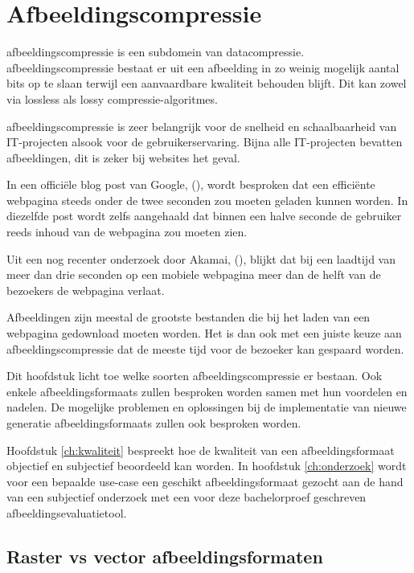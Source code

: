 \chapter{Afbeeldingscompressie}
\label{ch:afbeeldingscompressie}

\Gls{afbeeldingscompressie} is een subdomein van \gls{datacompressie}. \Gls{afbeeldingscompressie} bestaat er uit een afbeelding in zo weinig mogelijk aantal \glspl{bit} op te slaan terwijl een aanvaardbare kwaliteit behouden blijft. Dit kan zowel via \gls{lossless} als \gls{lossy} \glspl{compressie-algoritme}.

\Gls{afbeeldingscompressie} is zeer belangrijk voor de snelheid en schaalbaarheid van IT-projecten alsook voor de gebruikerservaring. Bijna alle IT-projecten bevatten afbeeldingen, dit is zeker bij websites het geval.

In een officiële blog post van Google,  (\cite{googleinternetspeed}), wordt besproken dat een efficiënte webpagina steeds onder de twee seconden zou moeten geladen kunnen worden. In diezelfde post wordt zelfs aangehaald dat binnen een halve seconde de gebruiker reeds inhoud van de webpagina zou moeten zien.

Uit een nog recenter onderzoek door Akamai,  (\cite{akamaiinternetspeed}), blijkt dat bij een laadtijd van meer dan drie seconden op een mobiele webpagina meer dan de helft van de bezoekers de webpagina verlaat.

Afbeeldingen zijn meestal de grootste bestanden die bij het laden van een webpagina gedownload moeten worden. Het is dan ook met een juiste keuze aan \gls{afbeeldingscompressie} dat de meeste tijd voor de bezoeker kan gespaard worden. 

Dit hoofdstuk licht toe welke soorten \gls{afbeeldingscompressie} er bestaan. Ook enkele \glspl{afbeeldingsformaat} zullen besproken worden samen met hun voordelen en nadelen. De mogelijke problemen en oplossingen bij de implementatie van nieuwe generatie \glspl{afbeeldingsformaat} zullen ook besproken worden.

Hoofdstuk \ref{ch:kwaliteit} bespreekt hoe de kwaliteit van een \gls{afbeeldingsformaat} objectief en subjectief beoordeeld kan worden. In hoofdstuk \ref{ch:onderzoek} wordt voor een bepaalde \gls{use-case} een geschikt \gls{afbeeldingsformaat} gezocht aan de hand van een subjectief onderzoek met een voor deze bachelorproef geschreven \gls{afbeeldingsevaluatietool}.

\section{Raster vs vector afbeeldingsformaten}
\label{sec:afbeeldingscompressie-raster-vector}

